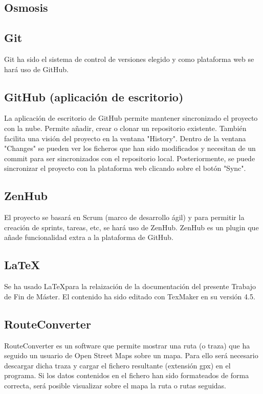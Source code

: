 \subsection{Osmosis}


\subsection{Git}
Git ha sido el sistema de control de versiones elegido y como plataforma web se hará uso de GitHub.

\subsection{GitHub (aplicación de escritorio)}
La aplicación de escritorio de GitHub permite mantener sincronizado el proyecto con la nube. Permite añadir, crear o clonar un repositorio existente. También facilita una visión del proyecto en la ventana "History". Dentro de la ventana "Changes" se pueden ver los ficheros que han sido modificados y necesitan de un commit para ser sincronizados con el repositorio local. Posteriormente, se puede sincronizar el proyecto con la plataforma web clicando sobre el botón "Sync".

\subsection{ZenHub}
El proyecto se basará en Scrum (marco de desarrollo ágil) y para permitir la creación de sprints, tareas, etc, se hará uso de ZenHub.
ZenHub es un plugin que añade funcionalidad extra a la plataforma de GitHub.

\subsection{\LaTeX}
Se ha usado \LaTeX  para la relaización de la documentación del presente Trabajo de Fin de Máster. El contenido ha sido editado con TexMaker en su versión 4.5.

\subsection{RouteConverter}
RouteConverter es un software que permite mostrar una ruta (o traza) que ha seguido un usuario de Open Street Maps sobre un mapa. Para ello será necesario descargar dicha traza y cargar el fichero resultante (extensión gpx) en el programa. Si los datos contenidos en el fichero han sido formateados de forma correcta, será posible visualizar sobre el mapa la ruta o rutas seguidas.